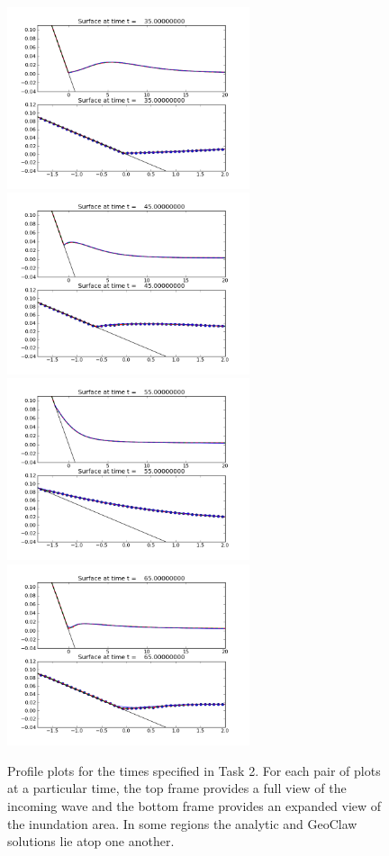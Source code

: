 \begin{figure}[ht]
\hfil\includegraphics[width=2.8in]{bp1/frame0001fig2.png}\hfil
\hfil\includegraphics[width=2.8in]{bp1/frame0003fig2.png}\hfil
\vskip 5pt
\hfil\includegraphics[width=2.8in]{bp1/frame0005fig2.png}\hfil
\hfil\includegraphics[width=2.8in]{bp1/frame0007fig2.png}\hfil
\caption{\label{fig:bp1frames} 
Profile plots for the times specified in Task 2.  For each pair of plots at a particular time, the top frame provides a full view of the incoming wave and the bottom frame provides an expanded view of the inundation area. In some regions the analytic and GeoClaw solutions lie atop one another.
}
\end{figure}

